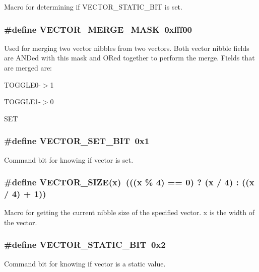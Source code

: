 Macro for determining if VECTOR\_\-STATIC\_\-BIT is set. 
\subsubsection{\setlength{\rightskip}{0pt plus 5cm}\#define VECTOR\_\-MERGE\_\-MASK\ 0xfff00}\label{group__vector__defs_a5}


Used for merging two vector nibbles from two vectors. Both vector nibble fields are ANDed with this mask and ORed together to perform the merge.  Fields that are merged are:\begin{CompactItemize}
\item 
TOGGLE0-$>$1\item 
TOGGLE1-$>$0\item 
SET \end{CompactItemize}
\subsubsection{\setlength{\rightskip}{0pt plus 5cm}\#define VECTOR\_\-SET\_\-BIT\ 0x1}\label{group__vector__defs_a0}


Command bit for knowing if vector is set. 
\subsubsection{\setlength{\rightskip}{0pt plus 5cm}\#define VECTOR\_\-SIZE(x)\ (((x \% 4) == 0) ? (x / 4) : ((x / 4) + 1))}\label{group__vector__defs_a4}


Macro for getting the current nibble size of the specified vector. x is the width of the vector. 
\subsubsection{\setlength{\rightskip}{0pt plus 5cm}\#define VECTOR\_\-STATIC\_\-BIT\ 0x2}\label{group__vector__defs_a1}


Command bit for knowing if vector is a static value. 